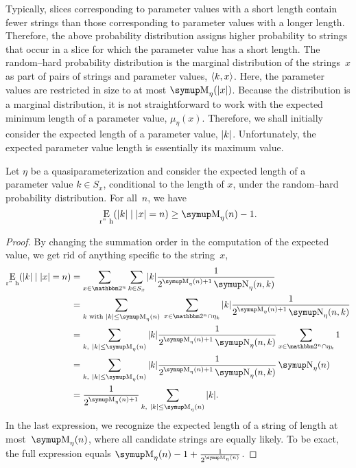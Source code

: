 Typically, slices corresponding to parameter values with a short length contain fewer strings than those corresponding to parameter values with a longer length.
Therefore, the above probability distribution assigns higher probability to strings that occur in a slice for which the parameter value has a short length.
The random--hard probability distribution is the marginal distribution of the strings~$x$ as part of pairs of strings and parameter values, ${\langle k, x\rangle}$.
Here, the parameter values are restricted in size to at most $\upM_\eta(\length{x})$.
Because the distribution is a marginal distribution, it is not straightforward to work with the expected minimum length of a parameter value, $\mu_\eta(x)$.
Therefore, we shall initially consider the expected length of a parameter value, ${\lvert k\rvert}$.
Unfortunately, the expected parameter value length is essentially its maximum value.
\begin{theorem}
\label{thm:expected_randomhard}%
  Let $\eta$ be a quasiparameterization and consider the expected length of a parameter value $k \in S_x$, conditional to the length of $x$, under the random--hard probability distribution.
  For all~$n$, we have
  \begin{equation*}
    \Ex_\mathrm{r"~h}(\length{k} \given \length{x} = n) \ge \upM_\eta(n) - 1.
  \end{equation*}
\end{theorem}
\begin{proof}
  By changing the summation order in the computation of the expected value, we get rid of anything specific to the string~$x$,
  \begin{align*}
    \Ex_\mathrm{r"~h}(\length{k} \given \length{x} = n)
      &= \sum_{x \in \binary^n} \sum_{k \in S_x} \length{k} \frac{1}{2^{\upM_\eta(n) + 1} \upN_\eta(n, k)} \\
      &= \sum_{k\text{ with }\length{k} \le \upM_\eta(n)}\;\sum_{x \in \binary^n \cap \eta_k} \length{k} \frac{1}{2^{\upM_\eta(n) + 1} \upN_\eta(n, k)} \\
      &= \sum_{k,\ \length{k} \le \upM_\eta(n)} \length{k} \frac{1}{2^{\upM_\eta(n) + 1} \upN_\eta(n, k)} \sum_{x \in \binary^n \cap \eta_k} 1 \\
      &= \sum_{k,\ \length{k} \le \upM_\eta(n)} \length{k} \frac{1}{2^{\upM_\eta(n) + 1} \upN_\eta(n, k)} \upN_\eta(n) \\
      &= \frac{1}{2^{\upM_\eta(n) + 1}} \sum_{k,\ \length{k} \le \upM_\eta(n)} \length{k}.
  \end{align*}
  In the last expression, we recognize the expected length of a string of length at most~$\upM_\eta(n)$, where all candidate strings are equally likely.
  To be exact, the full expression equals $\upM_\eta(n) - 1 + \frac{1}{2^{\upM_\eta(n)}}$.
\end{proof}

